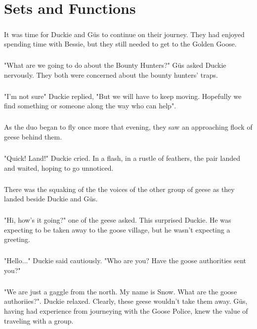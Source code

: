 \chapter{Sets and Functions}
\paragraph{} It was time for Duckie and Güs to continue on their journey. They had enjoyed spending time with Bessie, but they still needed to get to the Golden Goose.
\paragraph{} "What are we going to do about the Bounty Hunters?" Güs asked Duckie nervously. They both were concerned about the bounty hunters' traps.
\paragraph{} "I'm not sure" Duckie replied, "But we will have to keep moving. Hopefully we find something or someone along the way who can help".
\paragraph{} As the duo began to fly once more that evening, they saw an approaching flock of geese behind them.
\paragraph{} "Quick! Land!" Duckie cried. In a flash, in a rustle of feathers, the pair landed and waited, hoping to go unnoticed.
\paragraph{} There was the squaking of the the voices of the other group of geese as they landed beside Duckie and Güs.
\paragraph{} "Hi, how's it going?" one of the geese asked. This surprised Duckie. He was expecting to be taken away to the goose village, but he wasn't expecting a greeting.
\paragraph{} "Hello..." Duckie said cautiously. "Who are you? Have the goose authorities sent you?"
\paragraph{} "We are just a gaggle from the north. My name is Snow. What are the goose authoriies?". Duckie relaxed. Clearly, these geese wouldn't take them away. Güs, having had experience from journeying with the Goose Police, knew the value of traveling with a group.

